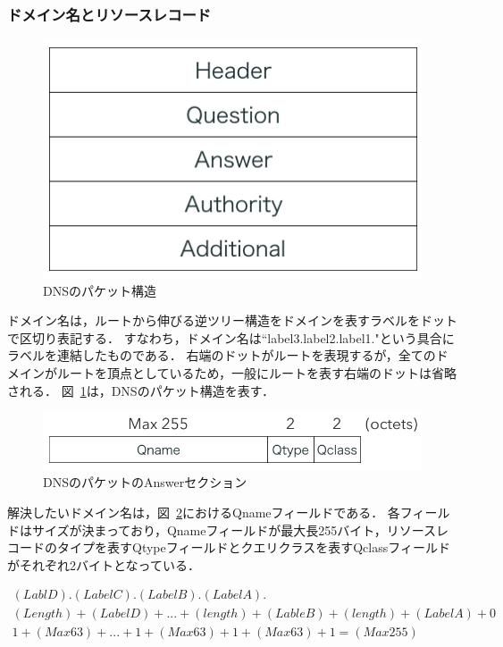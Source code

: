 
\subsubsection{ドメイン名とリソースレコード}
\begin{figure}[h]
 \centering
 \includegraphics[scale=0.7]{figure/dns-format.png}
 \caption{DNSのパケット構造}
 \label{fig:dns-format}
\end{figure}

ドメイン名は，ルートから伸びる逆ツリー構造をドメインを表すラベルをドットで区切り表記する．
すなわち，ドメイン名は``label3.label2.label1."という具合にラベルを連結したものである．
右端のドットがルートを表現するが，全てのドメインがルートを頂点としているため，一般にルートを表す右端のドットは省略される．
図~\ref{fig:dns-format}は，DNSのパケット構造を表す．

\begin{figure}[h]
 \centering
 \includegraphics[scale=0.6]{figure/dns-answer.png}
 \caption{DNSのパケットのAnswerセクション}
 \label{fig:dns-answer}
\end{figure}

解決したいドメイン名は，図~\ref{fig:dns-answer}におけるQnameフィールドである．
各フィールドはサイズが決まっており，Qnameフィールドが最大長255バイト，リソースレコードのタイプを表すQtypeフィールドとクエリクラスを表すQclassフィールドがそれぞれ2バイトとなっている．

\begin{eqnarray}
 (LablD).(LabelC).(LabelB).(LabelA). \label{eq:domain-name} \\
 (Length) + (LabelD) + ... + (length) + (LableB) + (length) + (LabelA) + 0 \label{eq:label-name} \\ 
 1 + (Max 63) + ... + 1 + (Max 63) + 1 + (Max 63) + 1 = (Max 255) \label{eq:length-label-domain}
\end{eqnarray}

